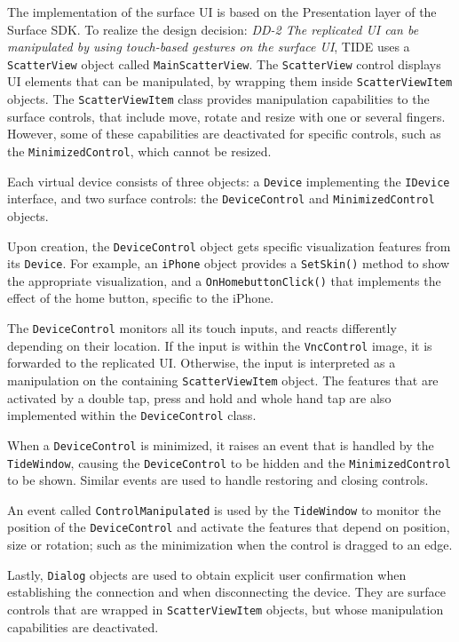 The implementation of the surface UI is based on the Presentation layer of the Surface SDK.
To realize the design decision:
\emph{DD-2 The replicated UI can be manipulated by using touch-based gestures on the surface UI},
TIDE uses a \texttt{ScatterView} object called \texttt{MainScatterView}.
The \texttt{ScatterView} control displays UI elements that can be manipulated, by wrapping them inside \texttt{ScatterViewItem} objects.
The \texttt{ScatterViewItem} class provides manipulation capabilities to the surface controls, that include move, rotate and resize with one or several fingers.
However, some of these capabilities are deactivated for specific controls, such as the \texttt{MinimizedControl}, which cannot be resized.

Each virtual device consists of three objects: a \texttt{Device} implementing the \texttt{IDevice} interface, and two surface controls: the \texttt{DeviceControl} and \texttt{MinimizedControl} objects.

Upon creation, the \texttt{DeviceControl} object gets specific visualization features from its \texttt{Device}.
For example, an \texttt{iPhone} object provides a \texttt{SetSkin()} method to show the appropriate visualization, and a \texttt{OnHomebuttonClick()} that implements the effect of the home button, specific to the iPhone.

The \texttt{DeviceControl} monitors all its touch inputs, and reacts differently depending on their location.
If the input is within the \texttt{VncControl} image, it is forwarded to the replicated UI.
Otherwise, the input is interpreted as a manipulation on the containing \texttt{ScatterViewItem} object.
The features that are activated by a double tap, press and hold and whole hand tap are also implemented within the \texttt{DeviceControl} class.


When a \texttt{DeviceControl} is minimized, it raises an event that is handled by the \texttt{TideWindow}, causing the \texttt{DeviceControl} to be hidden and the \texttt{MinimizedControl} to be shown.
Similar events are used to handle restoring and closing controls.

An event called \texttt{ControlManipulated} is used by the \texttt{TideWindow} to monitor the position of the \texttt{DeviceControl} and activate the features that depend on position, size or rotation; such as the minimization when the control is dragged to an edge.

Lastly, \texttt{Dialog} objects are used to obtain explicit user confirmation when establishing the connection and when disconnecting the device.
They are surface controls that are wrapped in \texttt{ScatterViewItem} objects, but whose manipulation capabilities are deactivated.



